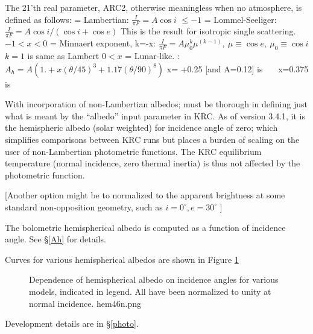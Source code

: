 \documentclass{article}
\begin{document}
The 21'th real parameter, ARC2, otherwise meaningless when no atmosphere, is defined as follows:
 = Lambertian: $\frac{I}{\pi F} = A \cos i$ 
\qi $\leq -1$  = Lommel-Seeliger: $\frac{I}{\pi F} =A \cos i /(\cos i+ \cos e) $
\qiii This is the result for isotropic single scattering.
\qi  $-1< x< 0$ = Minnaert exponent, k=-x: $\frac{I}{\pi F}= A \mu_0^k \mu^{(k-1)}, \ \mu \equiv \cos e, \  \mu_0 \equiv \cos i $
\qiii $k=1$ is same as Lambert
\qi $ 0<x $ = Lunar-like. : $A_h= A \left( 1.+ x (\theta/45)^3+1.17(\theta/90)^8 \right)$
\qiii x= +0.25 [and A=0.12] is  \ \ \ x=0.375 is  

With incorporation of non-Lambertian albedos; must be thorough in defining just
what is meant by the ``albedo'' input parameter in KRC.  As of version 3.4.1, it
is the hemispheric albedo (solar weighted) for incidence angle of zero; which
simplifies comparisons between KRC runs but places a burden of scaling on the
user of non-Lambertian photometric functions. The  KRC equilibrium temperature
(normal incidence, zero thermal inertia) is thus not affected by the
photometric function.

[Another option might be to normalized to the apparent brightness at some
  standard non-opposition geometry, such as $i=0^\circ,  e=30^\circ$ ]
 
The bolometric hemispherical albedo is computed as a function of incidence
angle.  See \S \ref{Ah} for details.

Curves for various hemispherical albedos are shown in Figure 
\ref{hem46n}  
\begin{figure}[!ht] 
\caption[Various hemispherical albedos]{Dependence of hemispherical albedo on
  incidence angles for various models, indicated in legend. All have been
  normalized to unity at normal incidence.
\label{hem46n}  hem46n.png }
\end{figure} 

Development details are in \S \ref{photo}.  
\end{document}
